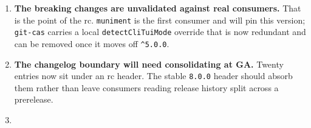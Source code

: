 \begin{enumerate}
  \textbf{The stable \texttt{8\allowbreak{}.\allowbreak{}0\allowbreak{}.\allowbreak{}0} tag must not be created while any row reads Inherited.}
\item
  \textbf{The breaking changes are unvalidated against real consumers.} That is the point of the rc. \texttt{m\allowbreak{}u\allowbreak{}n\allowbreak{}i\allowbreak{}m\allowbreak{}e\allowbreak{}n\allowbreak{}t} is the first consumer and will pin this version; \texttt{g\allowbreak{}i\allowbreak{}t\allowbreak{}-\allowbreak{}c\allowbreak{}a\allowbreak{}s} carries a local \texttt{d\allowbreak{}e\allowbreak{}t\allowbreak{}e\allowbreak{}c\allowbreak{}t\allowbreak{}C\allowbreak{}l\allowbreak{}i\allowbreak{}T\allowbreak{}u\allowbreak{}i\allowbreak{}M\allowbreak{}o\allowbreak{}d\allowbreak{}e} override that is now redundant and can be removed once it moves off \texttt{\textasciicircum{}\allowbreak{}5\allowbreak{}.\allowbreak{}0\allowbreak{}.\allowbreak{}0}.
\item
  \textbf{The changelog boundary will need consolidating at GA.} Twenty entries now sit under an rc header. The stable \texttt{8\allowbreak{}.\allowbreak{}0\allowbreak{}.\allowbreak{}0} header should absorb them rather than leave consumers reading release history split across a prerelease.
\item

\end{enumerate}
